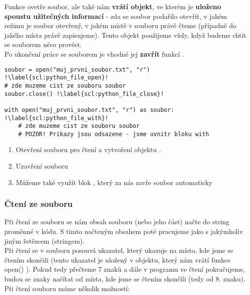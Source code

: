 Funkce  ovetře soubor, ale také nám \textbf{vrátí objekt}, ve kterém je \textbf{uloženo spoustu užitečných informací} - zda se soubor podařilo otevřít, v jakém režimu je soubor otevřený, v jakém místě v souboru právě čteme (případně do jakého místa právě zapisujeme). Tento objekt použijeme vždy, když budeme chtít se souborem něco provést.\\

Po ukončení práce se souborem je vhodné jej \textbf{zavřít} funkcí .\\

\begin{minipage}[t]{.45\textwidth}
\begin{code}
\begin{verbatim}
soubor = open("muj_prvni_soubor.txt", "r") !\label{scl:python_file_open}!
# zde muzeme cist ze souboru soubor
soubor.close() !\label{scl:python_file_close}!

with open("muj_prvni_soubor.txt", "r") as soubor: !\label{scl:python_file_with}!
	# zde muzeme cist ze souboru soubor
	# POZOR! Prikazy jsou odsazene - jsme uvnitr bloku with
\end{verbatim}

\label{code:python_soubor_open}
\end{code}
\end{minipage}
\begin{minipage}[t]{.45\textwidth}
\begin{enumerate}
\item[ř. \ref{scl:python_file_open}:] Otevření souboru pro čtení a vytvoření objektu .
\item[ř. \ref{scl:python_file_close}:] Uzavření souboru 
\vspace{2cm}
\item[ř. \ref{scl:python_file_with}:] Můžeme také využít blok , který za nás zavře soubor automaticky
\end{enumerate}
\end{minipage} 

\subsubsection{Čtení ze souboru}
Při čtení ze souboru se nám obsah souboru (nebo jeho část) načte do string proměnné v kódu. S tímto načteným obsahem poté pracujeme jako s jakýmkoliv jiným řetězcem (stringem).\\
Při čtení se v souboru posouvá ukazatel, který ukazuje na místo, kde jsme se čtením skončili (tento ukazatel je uložený v objektu, který nám vrátí funkce open() ). Pokud tedy přečteme 7 znaků a dále v programu ve čtení pokračujeme, budou se znaky načítat od místa, kde jsme se čtením skončili (tedy od 8. znaku).
Při čtení souboru máme několik možností:

